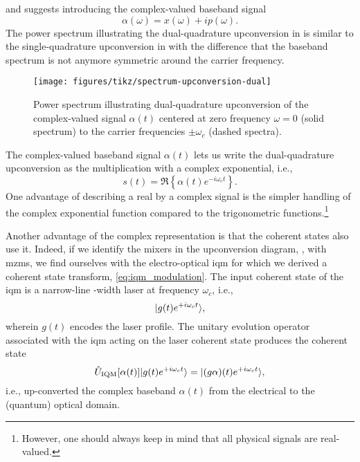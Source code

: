 and suggests introducing the complex-valued baseband signal
\begin{equation}
	\alpha(\omega)
	=
	x(\omega)
	+
	ip(\omega)
	.
\end{equation}
The power spectrum illustrating the dual-quadrature upconversion in  is similar to the single-quadrature upconversion in  with the difference that the baseband spectrum is not anymore symmetric around the carrier frequency.
\begin{figure}[htb]
	\centering
	\texttt{[image: figures/tikz/spectrum-upconversion-dual]}
	\caption{Power spectrum illustrating dual-quadrature upconversion of the complex-valued signal $\alpha(t)$ centered at zero frequency $\omega=0$ (solid spectrum) to the carrier frequencies $\pm\omega_c$ (dashed spectra).}\label{fig:spectrum_upconversion_dual}
\end{figure}
The complex-valued baseband signal $\alpha(t)$ lets us write the dual-quadrature upconversion as the multiplication with a complex exponential, i.e.,
\begin{equation}
	s(t)
	=
	\Re\left\{
		\alpha(t)
		e^{-i\omega_ct}
	\right\}
	.
	\label{eq:real_complex_passband}
\end{equation}
One advantage of describing a real by a complex signal is the simpler handling of the complex exponential function compared to the trigonometric functions.\footnote{However, one should always keep in mind that all physical signals are real-valued.}

Another advantage of the complex representation is that the coherent states also use it.
Indeed, if we identify the mixers in the upconversion diagram, , with \gls{mzm}s, we find ourselves with the electro-optical \gls{iqm} for which we derived a coherent state transform, \cref{eq:iqm_modulation}.
The input coherent state of the \gls{iqm} is a narrow-line -width laser at frequency $\omega_c$, i.e.,
\begin{equation}
	\lvert g(t)e^{+i\omega_ct}\rangle
	,
\end{equation}
wherein $g(t)$ encodes the laser profile.
The unitary evolution operator associated with the \gls{iqm} acting on the laser coherent state produces the coherent state
\begin{equation}
	\hat{U}_\text{IQM}[\alpha(t)]
	\lvert g(t)e^{+i\omega_ct}\rangle
	=
	\lvert(g\alpha)(t)e^{+i\omega_ct}\rangle
	,
\end{equation}
i.e., up-converted the complex baseband $\alpha(t)$ from the electrical to the (quantum) optical domain.